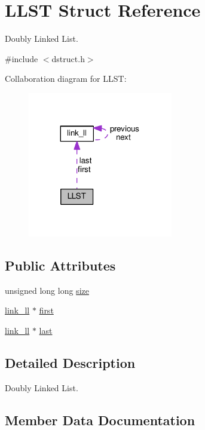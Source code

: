 \hypertarget{structLLST}{}\section{L\+L\+ST Struct Reference}
\label{structLLST}


Doubly Linked List.  




{\ttfamily \#include $<$dstruct.\+h$>$}



Collaboration diagram for L\+L\+ST\+:\nopagebreak
\begin{figure}[H]
\begin{center}
\leavevmode
\includegraphics[width=179pt]{structLLST__coll__graph}
\end{center}
\end{figure}
\subsection*{Public Attributes}
\begin{DoxyCompactItemize}
\item 
unsigned long long \hyperlink{structLLST_a3ee1e8d7f235f4e95951006e7f52bf73}{size}
\item 
\hyperlink{structlink__ll}{link\+\_\+ll} $\ast$ \hyperlink{structLLST_a64cb4ed06a05e5d9609ee66037c2d678}{first}
\item 
\hyperlink{structlink__ll}{link\+\_\+ll} $\ast$ \hyperlink{structLLST_a036571f75af8df62f99a7db4b94d6422}{last}
\end{DoxyCompactItemize}


\subsection{Detailed Description}
Doubly Linked List. 

\subsection{Member Data Documentation}

